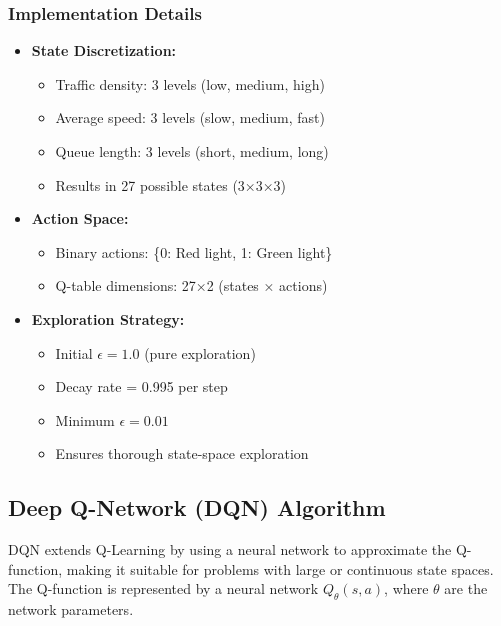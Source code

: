 \documentclass[a4paper, 12pt]{article}
\begin{document}
\subsubsection{Implementation Details}
\begin{tcolorbox}[title=Q-Learning Implementation]
\begin{itemize}
    \item \textbf{State Discretization:}
    \begin{itemize}
        \item Traffic density: 3 levels (low, medium, high)
        \item Average speed: 3 levels (slow, medium, fast)
        \item Queue length: 3 levels (short, medium, long)
        \item Results in 27 possible states (3×3×3)
    \end{itemize}

    \item \textbf{Action Space:}
    \begin{itemize}
        \item Binary actions: \{0: Red light, 1: Green light\}
        \item Q-table dimensions: 27×2 (states × actions)
    \end{itemize}

    \item \textbf{Exploration Strategy:}
    \begin{itemize}
        \item Initial $\epsilon = 1.0$ (pure exploration)
        \item Decay rate = 0.995 per step
        \item Minimum $\epsilon = 0.01$
        \item Ensures thorough state-space exploration
    \end{itemize}
\end{itemize}
\end{tcolorbox}

\subsection{Deep Q-Network (DQN) Algorithm}
DQN extends Q-Learning by using a neural network to approximate the Q-function, making it suitable for problems with large or continuous state spaces. The Q-function is represented by a neural network \( Q_\theta(s, a) \), where \( \theta \) are the network parameters.
\end{document}
